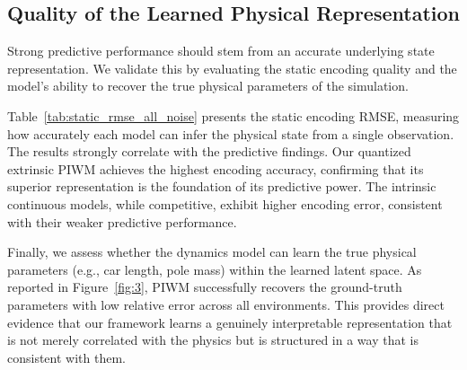 \documentclass[sigconf]{acmart}
\begin{document}
 
\subsection{Quality of the Learned Physical Representation}


Strong predictive performance should stem from an accurate underlying state representation. We validate this by evaluating the static encoding quality and the model's ability to recover the true physical parameters of the simulation.

Table~\ref{tab:static_rmse_all_noise} presents the static encoding RMSE, measuring how accurately each model can infer the physical state from a single observation. The results strongly correlate with the predictive findings. Our {quantized extrinsic PIWM achieves the highest encoding accuracy}, confirming that its superior representation is the foundation of its predictive power. The intrinsic continuous models, while competitive, exhibit higher encoding error, consistent with their weaker predictive performance.

Finally, we assess whether the dynamics model can learn the true physical parameters (e.g., car length, pole mass) within the learned latent space. As reported in Figure~\ref{fig:3}, PIWM successfully recovers the ground-truth parameters with low relative error across all environments. This provides direct evidence that our framework learns a genuinely interpretable representation that is not merely correlated with the physics but is structured in a way that is consistent with them.








\end{document}
